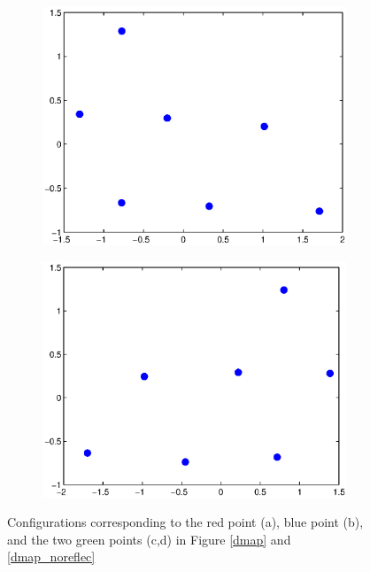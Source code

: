 \begin{figure}[t]
\begin{subfigure}{7cm}
\includegraphics[width=\textwidth]{config2}
\end{subfigure}
%
\begin{subfigure}{7cm}
\includegraphics[width=\textwidth]{config3}
\end{subfigure}
\caption[Representative configurations of Lennard-Jones cluster]{Configurations corresponding to the red point (a), blue point (b), and the two green points (c,d) in Figure \ref{dmap} and \ref{dmap_noreflec}}
\label{fig2}
\end{figure}

